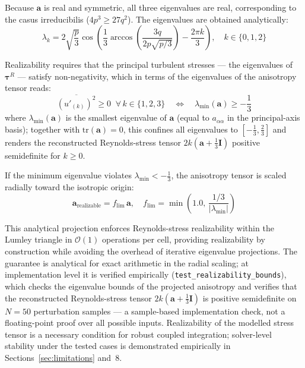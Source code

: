 \documentclass[11pt,a4paper]{article}
\begin{document}
Because $\mathbf{a}$ is real and symmetric, all three eigenvalues are real, corresponding to the casus irreducibilis ($4p^3 \ge 27q^2$). The eigenvalues are obtained analytically:
\begin{equation}
\lambda_k = 2\sqrt{\frac{p}{3}} \cos\left(\frac{1}{3}\arccos\left(\frac{3q}{2p\sqrt{p/3}}\right) - \frac{2\pi k}{3}\right), \quad k \in \{0, 1, 2\}
\end{equation}

Realizability requires that the principal turbulent stresses --- the eigenvalues of $\boldsymbol{\tau}^R$ --- satisfy non-negativity, which in terms of the eigenvalues of the anisotropy tensor reads:
\begin{equation}
\overline{(u'_{(k)})^2} \ge 0 \;\;\forall\, k \in \{1,2,3\} \quad\Longleftrightarrow\quad \lambda_{\min}(\mathbf{a}) \ge -\frac{1}{3}
\end{equation}
where $\lambda_{\min}(\mathbf{a})$ is the smallest eigenvalue of $\mathbf{a}$ (equal to $a_{\alpha\alpha}$ in the principal-axis basis); together with $\mathrm{tr}(\mathbf{a}) = 0$, this confines all eigenvalues to $[-\frac{1}{3}, \frac{2}{3}]$ and renders the reconstructed Reynolds-stress tensor $2k(\mathbf{a} + \frac{1}{3}\mathbf{I})$ positive semidefinite for $k \ge 0$.

If the minimum eigenvalue violates $\lambda_{\min} < -\frac{1}{3}$, the anisotropy tensor is scaled radially toward the isotropic origin:
\begin{equation}
\mathbf{a}_{\text{realizable}} = f_{\text{lim}} \, \mathbf{a}, \quad f_{\text{lim}} = \min\left(1.0, \, \frac{1/3}{|\lambda_{\min}|}\right)
\end{equation}

This analytical projection enforces Reynolds-stress realizability within the Lumley triangle in $\mathcal{O}(1)$ operations per cell, providing realizability by construction while avoiding the overhead of iterative eigenvalue projections. The guarantee is analytical for exact arithmetic in the radial scaling; at implementation level it is verified empirically (\texttt{test\_realizability\_bounds}), which checks the eigenvalue bounds of the projected anisotropy and verifies that the reconstructed Reynolds-stress tensor $2k(\mathbf{a} + \frac{1}{3}\mathbf{I})$ is positive semidefinite on $N = 50$ perturbation samples --- a sample-based implementation check, not a floating-point proof over all possible inputs. Realizability of the modelled stress tensor is a necessary condition for robust coupled integration; solver-level stability under the tested cases is demonstrated empirically in Sections~\ref{sec:limitations} and~8.
\end{document}
